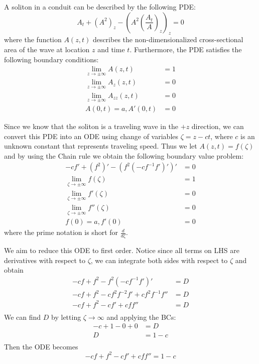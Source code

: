\documentclass[class=article,crop=false]{standalone}
\begin{document}
A soliton in a conduit can be described by the following PDE:
\begin{equation}
	A_t + (A^2)_z - \left( A^2 \left( \frac{A_t}{A } \right)_z  \right)_z =0 	
\end{equation}
where the function $ A(z,t)$ describes the non-dimensionalized cross-sectional area of the wave at location $ z$ and time  $ t$. Furthermore, the PDE satisfies the following boundary conditions:
\begin{align}
	\lim_{ z \to \pm \infty} A(z,t) &= 1 \\
	\lim_{ z \to \pm \infty} A_z(z,t) &= 0 \\
	\lim_{ z \to \pm \infty} A_{zz} (z,t) &= 0 \\
	A(0,t)=a, A'(0,t)&=0
\end{align}

Since we know that the soliton is a traveling wave in the $ +z$ direction, we can convert this PDE into an ODE using change of variables $ \zeta = z-ct$, where $ c$ is an unknown constant that represents traveling speed. Thus we let $ A(z,t) = f(\zeta)$ and by using the Chain rule we obtain the following boundary value problem:
\begin{align}
	-cf'+ (f^2)' - (f^2(-cf^{-1}f')')' &= 0 \\
	\lim_{ \zeta \to \pm \infty} f(\zeta) &= 1 \\
	\lim_{ \zeta \to \pm \infty} f'(\zeta) &= 0 \\
	\lim_{ \zeta \to \pm \infty} f'' (\zeta) &= 0 \\
	f(0)=a, f'(0)&=0 \label{eq:ic}
\end{align}
where the prime notation is short for $ \frac{d}{d \zeta}$.

We aim to reduce this ODE to first order. Notice since all terms on LHS are derivatives with respect to $ \zeta$, we can integrate both sides with respect to $ \zeta$ and obtain
\begin{equation}
\begin{split}
	-cf + f^2 - f^2(-cf^{-1}f')' &= D\\
	-cf + f^2 - cf^2 f^{-2} f' + cf^2 f^{-1} f''&= D \\
	-cf + f^2 - cf' + cf f''&= D \\
\end{split}
\end{equation}
We can find $ D$ by letting $ \zeta \to \infty$ and applying the BCs:
\begin{equation}
\begin{split}
	-c + 1 - 0 + 0 &= D \\
	D &= 1- c \\
\end{split}
\end{equation} 	
Then the ODE becomes
\begin{equation}
	-cf + f^2 - cf' + cf f''= 1-c 
\end{equation}
\end{document}
